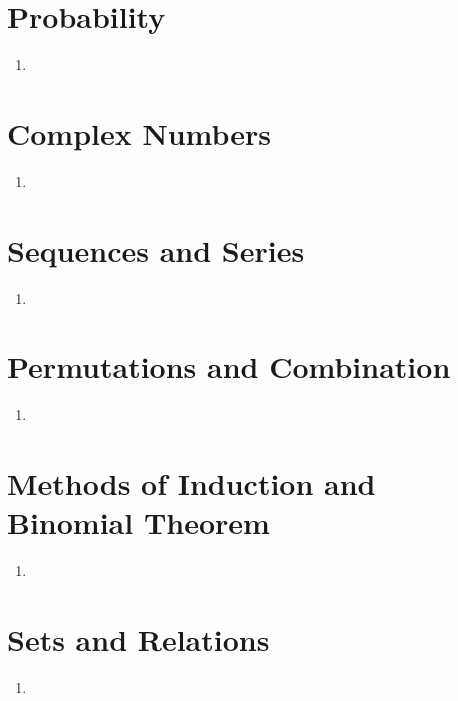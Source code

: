 \documentclass[17pt]{extarticle}
\begin{document}
\begin{multicols}{2}
\begin{enumerate}
\end{enumerate} 

\section{Probability}
\noindent
\begin{enumerate}
\item

\end{enumerate} 

\section{Complex Numbers}
\noindent
\begin{enumerate}
\item 

\end{enumerate} 

\section{Sequences and Series}
\noindent
\begin{enumerate}
\item

\end{enumerate} 

\section{Permutations and Combination}
\noindent
\begin{enumerate}
\item 

\end{enumerate} 


\section{Methods of Induction and Binomial Theorem}
\noindent
\begin{enumerate}
\item

\end{enumerate} 

\section{Sets and Relations}
\noindent
\begin{enumerate}
\item 


\end{enumerate}
\end{multicols}
\end{document}
